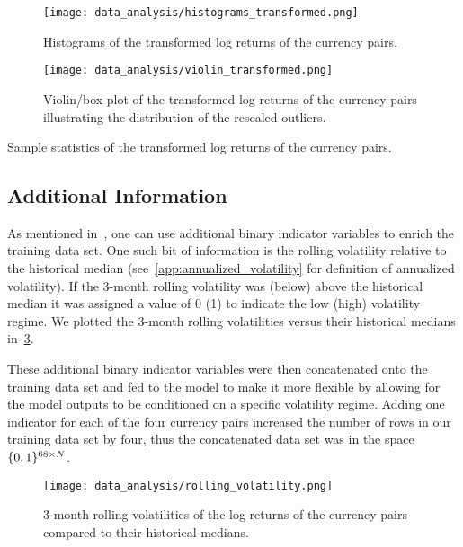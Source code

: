 \begin{figure}[!htb]
    \begin{center}
        \texttt{[image: data\_analysis/histograms\_transformed.png]}
    \end{center}
    \caption{Histograms of the transformed log returns of the currency pairs.}
    \label{fig:histograms_transformed}
\end{figure}
\begin{figure}[!htb]
    \begin{center}
        \texttt{[image: data\_analysis/violin\_transformed.png]}
    \end{center}
    \caption{Violin/box plot of the transformed log returns of the currency pairs illustrating the distribution of the rescaled outliers.}
    \label{fig:violin_transformed}
\end{figure}
\begin{table}[!htb]
    \centering
    \begin{adjustbox}{max width=\textwidth}
        
    \end{adjustbox}
    \caption{Sample statistics of the transformed log returns of the currency pairs.}
    \label{tbl:data_log_returns_transformed_stats}
\end{table}

\subsection{Additional Information}
As mentioned in~\cite{kondratyev_2019}, one can use additional binary indicator variables to enrich the training data set.
One such bit of information is the rolling volatility relative to the historical median (see~\cref{app:annualized_volatility} for definition of annualized volatility).
If the 3-month rolling volatility was (below) above the historical median it was assigned a value of 0 (1) to indicate the low (high) volatility regime.
We plotted the 3-month rolling volatilities versus their historical medians in~\cref{fig:rolling_volatility}.

These additional binary indicator variables were then concatenated onto the training data set and fed to the model to make it more flexible by allowing for the model outputs to be conditioned on a specific volatility regime.
Adding one indicator for each of the four currency pairs increased the number of rows in our training data set by four, thus the concatenated data set was in the space \( \{0,1\}^{68 \times N} \).

\begin{figure}[!htb]
    \begin{center}
        \texttt{[image: data\_analysis/rolling\_volatility.png]}
    \end{center}
    \caption{3-month rolling volatilities of the log returns of the currency pairs compared to their historical medians.}
    \label{fig:rolling_volatility}
\end{figure}
